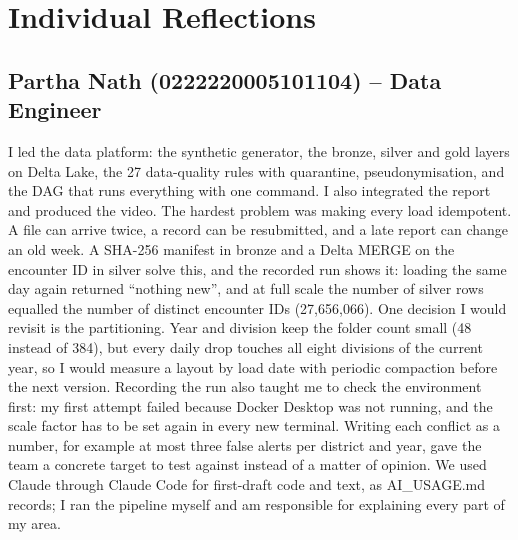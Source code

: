 \section{Individual Reflections}

\subsection*{Partha Nath (0222220005101104) -- Data Engineer}
I led the data platform: the synthetic generator, the bronze, silver and gold layers on Delta Lake, the 27
data-quality rules with quarantine, pseudonymisation, and the DAG that runs everything with one command. I also
integrated the report and produced the video. The hardest problem was making every load idempotent. A file can
arrive twice, a record can be resubmitted, and a late report can change an old week. A SHA-256 manifest in bronze
and a Delta MERGE on the encounter ID in silver solve this, and the recorded run shows it: loading the same day again
returned ``nothing new'', and at full scale the number of silver rows equalled the number of distinct encounter IDs
(27,656,066). One decision I would revisit is the partitioning. Year and division keep the folder count small (48
instead of 384), but every daily drop touches all eight divisions of the current year, so I would measure a layout by
load date with periodic compaction before the next version. Recording the run also taught me to check the
environment first: my first attempt failed because Docker Desktop was not running, and the scale factor has to be set
again in every new terminal. Writing each conflict as a number, for example at most three false alerts per district
and year, gave the team a concrete target to test against instead of a matter of opinion. We used Claude through
Claude Code for first-draft code and text, as AI\_USAGE.md records; I ran the pipeline myself and am responsible for
explaining every part of my area.

